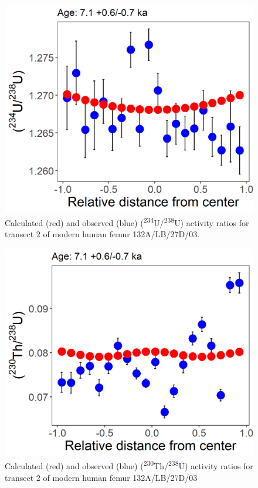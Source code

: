 \documentclass[]{article}
\begin{document}
\begin{figure}
\centering
\includegraphics{input/R48_Hobbit_MH2T_DAD.png}
\caption{Calculated (red) and observed (blue)
(\textsuperscript{234}U/\textsuperscript{238}U) activity ratios for
transect 2 of modern human femur 132A/LB/27D/03.}
\end{figure}

\begin{figure}
\centering
\includegraphics{input/R08_Hobbit_MH2T_DAD.png}
\caption{Calculated (red) and observed (blue)
(\textsuperscript{230}Th/\textsuperscript{238}U) activity ratios for
transect 2 of modern human femur 132A/LB/27D/03}
\end{figure}
\end{document}
